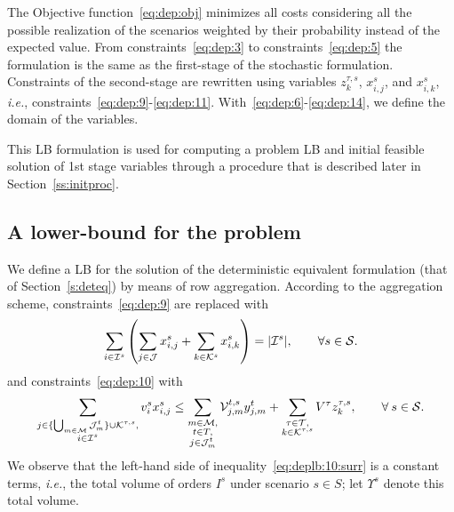 \documentclass[a4paper,11pt]{article}
\begin{document}
	The Objective function~\eqref{eq:dep:obj} minimizes all costs considering all the possible realization of the scenarios weighted by their probability instead of the expected value. 
	From constraints~\eqref{eq:dep:3} to constraints~\eqref{eq:dep:5} the formulation is the same as the first-stage of the stochastic formulation.
	Constraints of the second-stage are rewritten using variables $z_k^{\tau,s}$, $ x_{i,j}^{s}$, and $ x_{i,k}^{s}$, \textit{i.e.}, constraints~\eqref{eq:dep:9}-\eqref{eq:dep:11}.
	With~\eqref{eq:dep:6}-\eqref{eq:dep:14}, we define the domain of the variables.

	This LB formulation is used for computing a problem LB and initial feasible solution of 1st stage variables through a procedure that is described later in Section~\ref{ss:initproc}.
	
	
	\subsection{A lower-bound for the problem}\label{ss:problb}
	We define a LB for the solution of the deterministic equivalent formulation (that of Section~\ref{s:deteq}) by means of row aggregation.
	According to the aggregation scheme, constraints~\eqref{eq:dep:9} are replaced with
	\begin{equation}\label{eq:dep:9:surr}
		\sum\limits_{i \in {\cal I}^{s}} \left( \sum\limits_{j \in \cal J}x_{i,j}^{s} + \sum\limits_{k \in {\cal K}^{s}}x_{i,k}^{s} \right) = | {\cal I}^{s}|, \qquad \forall s \in {\cal S}.
	\end{equation}
	and constraints~\eqref{eq:dep:10} with
	\begin{equation}\label{eq:deplb:10:surr}
		\sum\limits_{\substack{j \in \{\bigcup_{m \in {\cal M}} {\cal J}^t_{m}\} \cup {\cal K}^{\tau,s}, \\ i \in {\cal I}^{s}}} v_i^{s} x_{i,j}^{s} 
		\leq \sum\limits_{\substack{ m \in {\cal M}, \\ t \in T, \\ j \in {\cal J}^t_{m}}} {\cal V}_{j,m}^{t,s} y_{j,m}^t + \sum\limits_{\substack{\tau \in {\cal T}, \\ k \in {\cal K}^{\tau,s}}} V^{\tau} z_k^{\tau,s}, \qquad \forall \: s \in {\cal S}.
	\end{equation}
	We observe that the left-hand side of inequality~\eqref{eq:deplb:10:surr} is a constant terms, \textit{i.e.}, the total volume of orders $ I^s$ under scenario $ s \in S$; let $ \Upsilon^s$ denote this total volume.
	
\end{document}
